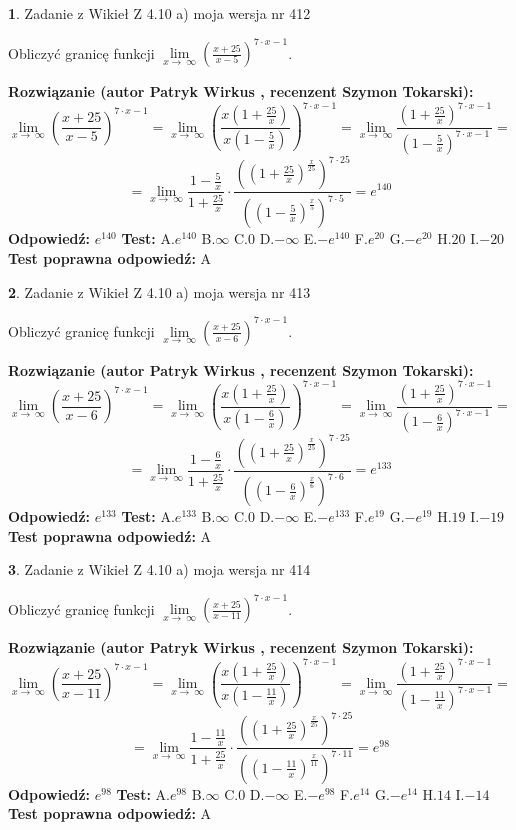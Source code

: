 \documentclass[12pt, a4paper]{article}
\theoremstyle{definition} %
\newtheorem{zad}{}
\newcommand{\zadStart}[1]{\begin{zad}#1\newline}
\newcommand{\zadStop}{\end{zad}}
\newcommand{\rozwStart}[2]{\noindent \textbf{Rozwiązanie (autor #1 , recenzent #2): }\newline}
\newcommand{\rozwStop}{\newline}
\newcommand{\odpStart}{\noindent \textbf{Odpowiedź:}\newline}
\newcommand{\odpStop}{\newline}
\newcommand{\testStart}{\noindent \textbf{Test:}\newline}
\newcommand{\testStop}{\newline}
\newcommand{\kluczStart}{\noindent \textbf{Test poprawna odpowiedź:}\newline}
\newcommand{\kluczStop}{\newline}
\begin{document}
\zadStart{Zadanie z Wikieł Z 4.10 a) moja wersja nr 412}

Obliczyć granicę funkcji  $\lim\limits_{x\to\ \infty}(\frac{x+25}{x-5})^{7\cdot x-1}$.
\zadStop
\rozwStart{Patryk Wirkus}{Szymon Tokarski}
$$\lim\limits_{x\to\ \infty}(\frac{x+25}{x-5})^{7\cdot x-1} = \lim\limits_{x\to\ \infty}(\frac{x(1+\frac{25}{x})}{x(1-\frac{5}{x})})^{7\cdot x-1}=\lim\limits_{x\to\ \infty}\frac{(1+\frac{25}{x})^{7\cdot x-1}}{(1-\frac{5}{x})^{7\cdot x-1}}=$$
$$=\lim\limits_{x\to\ \infty}\frac{1-\frac{5}{x}}{1+\frac{25}{x}}\cdot\frac{((1+\frac{25}{x})^{\frac{x}{25}})^{7\cdot25}}{((1-\frac{5}{x})^{\frac{x}{5}})^{7\cdot5}}=e^{140}$$
\rozwStop
\odpStart
$e^{140}$
\odpStop
\testStart
A.$e^{140}$ B.$\infty$ C.$0$ D.$-\infty$ E.$-e^{140}$
F.$e^{20}$ G.$-e^{20}$
H.$20$
I.$-20$
\testStop
\kluczStart
A
\kluczStop



\zadStart{Zadanie z Wikieł Z 4.10 a) moja wersja nr 413}

Obliczyć granicę funkcji  $\lim\limits_{x\to\ \infty}(\frac{x+25}{x-6})^{7\cdot x-1}$.
\zadStop
\rozwStart{Patryk Wirkus}{Szymon Tokarski}
$$\lim\limits_{x\to\ \infty}(\frac{x+25}{x-6})^{7\cdot x-1} = \lim\limits_{x\to\ \infty}(\frac{x(1+\frac{25}{x})}{x(1-\frac{6}{x})})^{7\cdot x-1}=\lim\limits_{x\to\ \infty}\frac{(1+\frac{25}{x})^{7\cdot x-1}}{(1-\frac{6}{x})^{7\cdot x-1}}=$$
$$=\lim\limits_{x\to\ \infty}\frac{1-\frac{6}{x}}{1+\frac{25}{x}}\cdot\frac{((1+\frac{25}{x})^{\frac{x}{25}})^{7\cdot25}}{((1-\frac{6}{x})^{\frac{x}{6}})^{7\cdot6}}=e^{133}$$
\rozwStop
\odpStart
$e^{133}$
\odpStop
\testStart
A.$e^{133}$ B.$\infty$ C.$0$ D.$-\infty$ E.$-e^{133}$
F.$e^{19}$ G.$-e^{19}$
H.$19$
I.$-19$
\testStop
\kluczStart
A
\kluczStop



\zadStart{Zadanie z Wikieł Z 4.10 a) moja wersja nr 414}

Obliczyć granicę funkcji  $\lim\limits_{x\to\ \infty}(\frac{x+25}{x-11})^{7\cdot x-1}$.
\zadStop
\rozwStart{Patryk Wirkus}{Szymon Tokarski}
$$\lim\limits_{x\to\ \infty}(\frac{x+25}{x-11})^{7\cdot x-1} = \lim\limits_{x\to\ \infty}(\frac{x(1+\frac{25}{x})}{x(1-\frac{11}{x})})^{7\cdot x-1}=\lim\limits_{x\to\ \infty}\frac{(1+\frac{25}{x})^{7\cdot x-1}}{(1-\frac{11}{x})^{7\cdot x-1}}=$$
$$=\lim\limits_{x\to\ \infty}\frac{1-\frac{11}{x}}{1+\frac{25}{x}}\cdot\frac{((1+\frac{25}{x})^{\frac{x}{25}})^{7\cdot25}}{((1-\frac{11}{x})^{\frac{x}{11}})^{7\cdot11}}=e^{98}$$
\rozwStop
\odpStart
$e^{98}$
\odpStop
\testStart
A.$e^{98}$ B.$\infty$ C.$0$ D.$-\infty$ E.$-e^{98}$
F.$e^{14}$ G.$-e^{14}$
H.$14$
I.$-14$
\testStop
\kluczStart
A
\kluczStop
\end{document}
